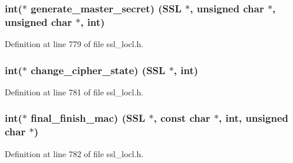 \subsubsection[{\texorpdfstring{generate\+\_\+master\+\_\+secret}{generate_master_secret}}]{\setlength{\rightskip}{0pt plus 5cm}int($\ast$ generate\+\_\+master\+\_\+secret) ({\bf S\+SL} $\ast$, unsigned char $\ast$, unsigned char $\ast$, int)}\hypertarget{structssl3__enc__method_ae3fc4648a5b6b9b630c8ce6b8662d934}{}\label{structssl3__enc__method_ae3fc4648a5b6b9b630c8ce6b8662d934}


Definition at line 779 of file ssl\+\_\+locl.\+h.

\subsubsection[{\texorpdfstring{change\+\_\+cipher\+\_\+state}{change_cipher_state}}]{\setlength{\rightskip}{0pt plus 5cm}int($\ast$ change\+\_\+cipher\+\_\+state) ({\bf S\+SL} $\ast$, int)}\hypertarget{structssl3__enc__method_a8e04c20ccfa9133c7f7b2e9fd21cdef3}{}\label{structssl3__enc__method_a8e04c20ccfa9133c7f7b2e9fd21cdef3}


Definition at line 781 of file ssl\+\_\+locl.\+h.

\subsubsection[{\texorpdfstring{final\+\_\+finish\+\_\+mac}{final_finish_mac}}]{\setlength{\rightskip}{0pt plus 5cm}int($\ast$ final\+\_\+finish\+\_\+mac) ({\bf S\+SL} $\ast$, const char $\ast$, int, unsigned char $\ast$)}\hypertarget{structssl3__enc__method_a52360202fb30e0ffac336aa3bd9e8737}{}\label{structssl3__enc__method_a52360202fb30e0ffac336aa3bd9e8737}


Definition at line 782 of file ssl\+\_\+locl.\+h.

